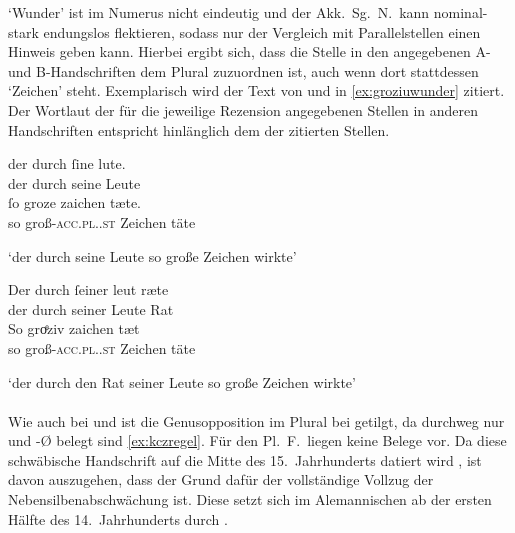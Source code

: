  `Wunder' ist im Numerus nicht eindeutig und der Akk.\ Sg.\
N.\ kann nominal-stark endungslos flektieren, sodass nur der Vergleich mit
Parallelstellen einen Hinweis geben kann. Hierbei ergibt sich, dass die Stelle
in den angegebenen A- und B-Handschriften dem Plural zuzuordnen ist, auch wenn
dort stattdessen \norm{ƶėichen} `Zeichen' steht. Exemplarisch wird der
Text von \citet{kc:A1} und \citet{kc:B1} in \cref{ex:groziuwunder} zitiert. Der
Wortlaut der für die jeweilige Rezension angegebenen Stellen in anderen
Handschriften entspricht hinlänglich dem der zitierten Stellen.

\begin{exe}
\ex \label{ex:groziuwunder}
	\begin{xlist}
	\ex \label{ex:groziuwunder_1}
		\gll der durch ſine lute. \\
			der durch seine Leute \\
	\sn \gll ſo groze zaichen tæte. \\
			so groß-\textsc{acc.pl.\NeutI.st} Zeichen täte \\
		\begin{taggedline}{\parencites%
			[\pno~45\rb, 10--11]{kc:A1}[vgl.]%
			[\pno~62\rb, 29--30]{kc:H}%
			[10331--10332]{schroeder1895}%
		}
		\trans `der durch seine Leute so große Zeichen wirkte'
		\end{taggedline}

	\ex \label{ex:groziuwunder_2}
		\gll Der durch ſeiner leut ræte \\
			der durch seiner Leute Rat \\
	\sn \gll So groͤziv zaichen tæt \\
			so groß-\textsc{acc.pl.\NeutI.st} Zeichen täte \\
		\begin{taggedline}{\parencites%
			[\pno~28\vb, 17--18]{kc:B1}[vgl.]%
			[\pno~49\vb, 17--18]{kc:VB}%
			[10331--10332]{schroeder1895}%
		}
		\trans `der durch den Rat seiner Leute so große Zeichen wirkte'
		\end{taggedline}
	\end{xlist}
\end{exe}

\paragraph{\citet{kc:Z}} Wie auch bei \citet{kc:H} und \citet{kc:P} ist die
Genusopposition im Plural bei \citet{kc:Z} getilgt, da durchweg nur 
und -Ø belegt sind \cref{ex:kczregel}. Für den Pl.~F.\ liegen keine Belege vor.
Da diese schwäbische Handschrift auf die Mitte des 15.~Jahrhunderts datiert
wird \autocite[32]{wolf:kckat}, ist davon auszugehen, dass der Grund dafür der
vollständige Vollzug der Nebensilbenabschwächung ist. Diese setzt sich im
Alemannischen ab der ersten Hälfte des 14.~Jahrhunderts durch
\autocites(Schwäbisch wird nicht gesondert ausgewiesen)[vgl.][267,
Abb.~A~69]{ksw2}.

